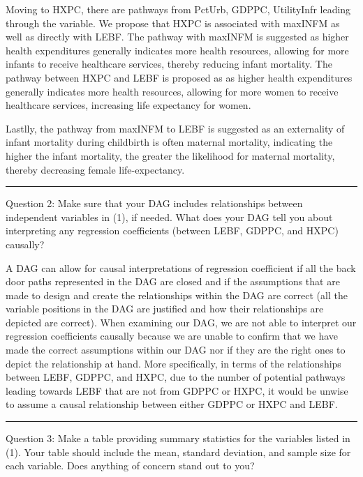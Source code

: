 \documentclass[
]{article}
\begin{document}
Moving to HXPC, there are pathways from PctUrb, GDPPC, UtilityInfr
leading through the variable. We propose that HXPC is associated with
maxINFM as well as directly with LEBF. The pathway with maxINFM is
suggested as higher health expenditures generally indicates more health
resources, allowing for more infants to receive healthcare services,
thereby reducing infant mortality. The pathway between HXPC and LEBF is
proposed as as higher health expenditures generally indicates more
health resources, allowing for more women to receive healthcare
services, increasing life expectancy for women.

Lastlly, the pathway from maxINFM to LEBF is suggested as an externality
of infant mortality during childbirth is often maternal mortality,
indicating the higher the infant mortality, the greater the likelihood
for maternal mortality, thereby decreasing female life-expectancy.

\begin{center}\rule{0.5\linewidth}{0.5pt}\end{center}

Question 2: Make sure that your DAG includes relationships between
independent variables in (1), if needed. What does your DAG tell you
about interpreting any regression coefficients (between LEBF, GDPPC, and
HXPC) causally?

A DAG can allow for causal interpretations of regression coefficient if
all the back door paths represented in the DAG are closed and if the
assumptions that are made to design and create the relationships within
the DAG are correct (all the variable positions in the DAG are justified
and how their relationships are depicted are correct). When examining
our DAG, we are not able to interpret our regression coefficients
causally because we are unable to confirm that we have made the correct
assumptions within our DAG nor if they are the right ones to depict the
relationship at hand. More specifically, in terms of the relationships
between LEBF, GDPPC, and HXPC, due to the number of potential pathways
leading towards LEBF that are not from GDPPC or HXPC, it would be unwise
to assume a causal relationship between either GDPPC or HXPC and LEBF.

\begin{center}\rule{0.5\linewidth}{0.5pt}\end{center}

Question 3: Make a table providing summary statistics for the variables
listed in (1). Your table should include the mean, standard deviation,
and sample size for each variable. Does anything of concern stand out to
you?
\end{document}
